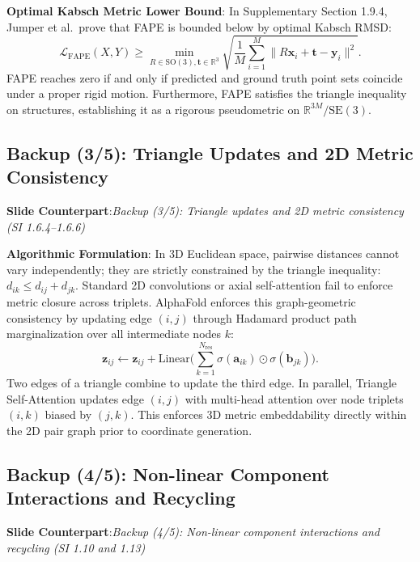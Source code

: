 \documentclass[10pt,a4paper]{article}
\newcommand{\SE}{\mathrm{SE}(3)}
\newcommand{\SO}{\mathrm{SO}(3)}
\newcommand{\R}{\mathbb{R}}
\begin{document}
\textbf{Optimal Kabsch Metric Lower Bound}:
In Supplementary Section 1.9.4, Jumper et al.\ prove that FAPE is bounded below by optimal Kabsch RMSD:
\begin{equation}
\mathcal{L}_{\text{FAPE}}(X, Y) \ge \min_{R \in \SO, \bm{t} \in \R^3} \sqrt{\frac{1}{M}\sum_{i=1}^M \| R\bm{x}_i + \bm{t} - \bm{y}_i \|^2}.
\end{equation}
FAPE reaches zero if and only if predicted and ground truth point sets coincide under a proper rigid motion. Furthermore, FAPE satisfies the triangle inequality on structures, establishing it as a rigorous pseudometric on $\R^{3M}/\SE$.

\subsection{Backup (3/5): Triangle Updates and 2D Metric Consistency}
\textbf{Slide Counterpart}:\enspace \textsl{Backup (3/5): Triangle updates and 2D metric consistency (SI 1.6.4--1.6.6)}

\textbf{Algorithmic Formulation}:
In 3D Euclidean space, pairwise distances cannot vary independently; they are strictly constrained by the triangle inequality: $d_{ik} \le d_{ij} + d_{jk}$. Standard 2D convolutions or axial self-attention fail to enforce metric closure across triplets.
AlphaFold enforces this graph-geometric consistency by updating edge $(i,j)$ through Hadamard product path marginalization over all intermediate nodes $k$:
\begin{equation}
\mathbf{z}_{ij} \leftarrow \mathbf{z}_{ij} + \mathrm{Linear}\Big(\sum_{k=1}^{N_{\text{res}}} \sigma(\mathbf{a}_{ik}) \odot \sigma(\mathbf{b}_{jk})\Big).
\end{equation}
Two edges of a triangle combine to update the third edge. In parallel, Triangle Self-Attention updates edge $(i,j)$ with multi-head attention over node triplets $(i,k)$ biased by $(j,k)$. This enforces 3D metric embeddability directly within the 2D pair graph prior to coordinate generation.

\subsection{Backup (4/5): Non-linear Component Interactions and Recycling}
\textbf{Slide Counterpart}:\enspace \textsl{Backup (4/5): Non-linear component interactions and recycling (SI 1.10 and 1.13)}
\end{document}
